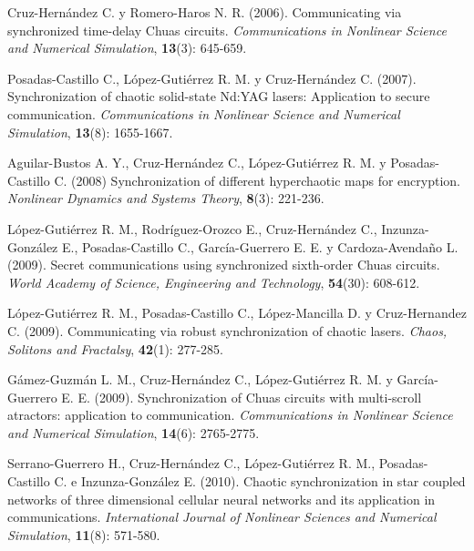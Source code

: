 \begin{thebibliography}{00}
Cruz-Hernández C. y Romero-Haros N. R. (2006).
\newblock Communicating via synchronized time-delay Chuas circuits.
\newblock \emph{Communications in Nonlinear Science and Numerical Simulation}, \textbf{13}(3): 645-659.

Posadas-Castillo C., López-Gutiérrez R. M. y Cruz-Hernández C. (2007).
\newblock Synchronization of chaotic solid-state Nd:YAG lasers: Application to secure communication.
\newblock \emph{Communications in Nonlinear Science and Numerical Simulation}, \textbf{13}(8): 1655-1667.

Aguilar-Bustos A. Y., Cruz-Hernández C., López-Gutiérrez R. M. y Posadas-Castillo C. (2008)
\newblock Synchronization of different hyperchaotic maps for encryption.
\newblock \emph{Nonlinear Dynamics and Systems Theory}, \textbf{8}(3): 221-236.

López-Gutiérrez R. M., Rodríguez-Orozco E., Cruz-Hernández C., Inzunza-González E., Posadas-Castillo C., García-Guerrero E. E. y Cardoza-Avendaño L. (2009).
\newblock Secret communications using synchronized sixth-order Chuas circuits.
\newblock \emph{World Academy of Science, Engineering and Technology}, \textbf{54}(30): 608-612.

López-Gutiérrez R. M., Posadas-Castillo C., López-Mancilla D. y Cruz-Hernandez C. (2009).
\newblock Communicating via robust synchronization of chaotic lasers.
\newblock \emph{Chaos, Solitons and Fractalsy}, \textbf{42}(1): 277-285.

Gámez-Guzmán L. M., Cruz-Hernández C., López-Gutiérrez R. M. y García-Guerrero E. E. (2009).
\newblock Synchronization of Chuas circuits with multi-scroll atractors: application to communication.
\newblock \emph{Communications in Nonlinear Science and Numerical Simulation}, \textbf{14}(6): 2765-2775.

Serrano-Guerrero H., Cruz-Hernández C., López-Gutiérrez R. M., Posadas-Castillo C. e Inzunza-González E. (2010).
\newblock Chaotic synchronization in star coupled networks of three dimensional cellular neural networks and its application in communications.
\newblock \emph{International Journal of Nonlinear Sciences and Numerical Simulation}, \textbf{11}(8): 571-580.


\end{thebibliography}
